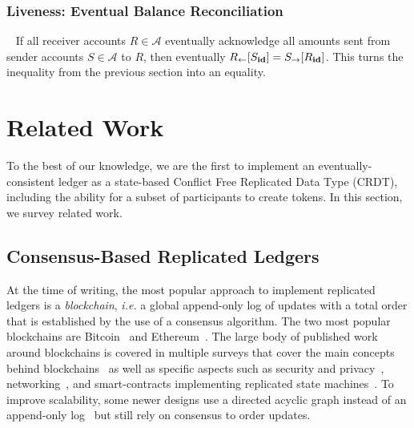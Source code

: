 \documentclass[9pt]{article}   	%
\begin{document}
\subsubsection{Liveness: Eventual Balance Reconciliation}
\label{sec:proof:balance-liveness}

\pf~ If all receiver accounts $R \in \mathcal{A}$ eventually acknowledge all amounts sent from sender accounts $S \in \mathcal{A}$ to $R$, then eventually $R_{\leftarrow}[S_{\scriptsize \textbf{id}}] = S_{\rightarrow}[R_{\scriptsize \textbf{id}}]$.  This turns the inequality from the previous section into an equality.


\section{Related Work}
\label{sec:related-work}

To the best of our knowledge, we are the first to implement an eventually-consistent ledger as a state-based Conflict Free Replicated Data Type (CRDT), including the ability for a subset of participants to create tokens. In this section, we survey related work.

\subsection{Consensus-Based Replicated Ledgers}

At the time of writing, the most popular approach to implement replicated ledgers is a \textit{blockchain}, \textit{i.e.} a global append-only log of updates with a total order that is established by the use of a consensus algorithm. The two most popular blockchains are Bitcoin~\cite{nakamoto2008bitcoin} and Ethereum~\cite{buterin2014next}. The large body of published work around blockchains is covered in multiple surveys that cover the main concepts behind blockchains~\cite{weichao2018blockchain,kolb2020survey-blockchains-ethereum} as well as specific aspects such as security and privacy~\cite{zhang2020survey-security-privacy-blockchains}, networking~\cite{dotan2022survey-blockchain-networking}, and smart-contracts implementing replicated state machines~\cite{kolb2020survey-blockchains-ethereum}. To improve scalability, some newer designs use a directed acyclic graph instead of an append-only log~\cite{kolb2020survey-blockchains-ethereum} but still rely on consensus to order updates.
\end{document}
